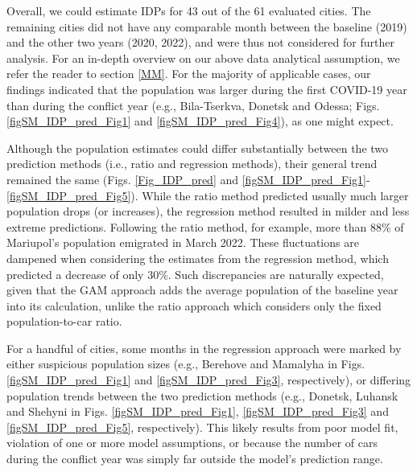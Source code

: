 \documentclass[sn-basic]{sn-jnl}%
\begin{document}
Overall, we could estimate IDPs for 43 out of the 61 evaluated cities. The remaining cities did not have any comparable month between the baseline (2019) and the other two years (2020, 2022), and were thus not considered for further analysis. For an in-depth overview on our above data analytical assumption, we refer the reader to section \ref{MM}. %
 For the majority of applicable cases, our findings indicated that the population was larger during the first COVID-19 year than during the conflict year (e.g., Bila-Tserkva, Donetsk and Odessa; Figs. \ref{figSM_IDP_pred_Fig1} and \ref{figSM_IDP_pred_Fig4}), as one might expect. %


Although the population estimates could differ substantially between the two prediction methods (i.e., ratio and regression methods), their general trend remained the same (Figs. \ref{Fig_IDP_pred} and \ref{figSM_IDP_pred_Fig1}-\ref{figSM_IDP_pred_Fig5}). While the ratio method predicted usually much larger population drops (or increases), the regression method resulted in milder and less extreme predictions. Following the ratio method, for example, more than 88\% of Mariupol's population emigrated in March 2022. These fluctuations are dampened when considering the estimates from the regression method, which predicted a decrease of only 30\%. Such discrepancies are naturally expected, given that the GAM approach adds the average population of the baseline year into its calculation, unlike the ratio approach which considers only the fixed population-to-car ratio. %

For a handful of cities, some months in the regression approach were marked by either suspicious population sizes (e.g., Berehove and Mamalyha in Figs. \ref{figSM_IDP_pred_Fig1} and \ref{figSM_IDP_pred_Fig3}, respectively), or differing population trends between the two prediction methods (e.g., Donetsk, Luhansk and Shehyni in Figs. \ref{figSM_IDP_pred_Fig1}, \ref{figSM_IDP_pred_Fig3} and \ref{figSM_IDP_pred_Fig5}, respectively). This likely results from poor model fit, violation of one or more model assumptions, or because the number of cars during the conflict year was simply far outside the model's prediction range. 
\end{document}
